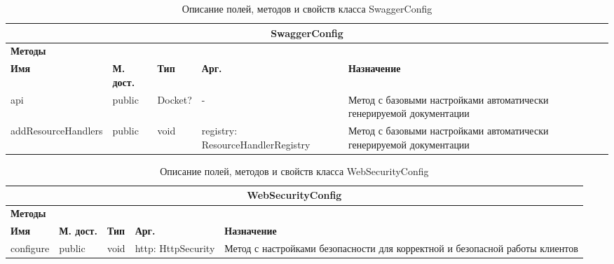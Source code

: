 \documentclass{../includes/TechDoc}
\begin{document}
    \begin{table}[h]
        \caption{\label{tab:class-SwaggerConfig-table}Описание полей, методов и свойств класса SwaggerConfig}
        \begin{tabularx}{\textwidth}{|l|l|l|l|X|}
            \hline
            \multicolumn{5}{|c|}{SwaggerConfig} \\ \hline
            \multicolumn{5}{|l|}{\textbf{Методы}} \\ \hline
            \textbf{Имя}        & \textbf{М. дост.} & \textbf{Тип} & \textbf{Арг.}                     & \textbf{Назначение}                                                  \\ \hline
            api                 & public            & Docket?      & -                                 & Метод с базовыми настройками автоматически генерируемой документации \\ \hline
            addResourceHandlers & public            & void         & registry: ResourceHandlerRegistry & Метод с базовыми настройками автоматически генерируемой документации \\ \hline
        \end{tabularx}
    \end{table}

    \begin{table}[h]
        \caption{\label{tab:class-WebSecurityConfig-table}Описание полей, методов и свойств класса WebSecurityConfig}
        \begin{tabularx}{\textwidth}{|l|l|l|l|X|}
            \hline
            \multicolumn{5}{|c|}{WebSecurityConfig} \\ \hline
            \multicolumn{5}{|l|}{\textbf{Методы}} \\ \hline
            \textbf{Имя} & \textbf{М. дост.} & \textbf{Тип} & \textbf{Арг.}      & \textbf{Назначение}                                                          \\ \hline
            configure    & public            & void         & http: HttpSecurity & Метод с настройками безопасности для корректной и безопасной работы клиентов \\ \hline
        \end{tabularx}
    \end{table}

    \registrationList
\end{document}
